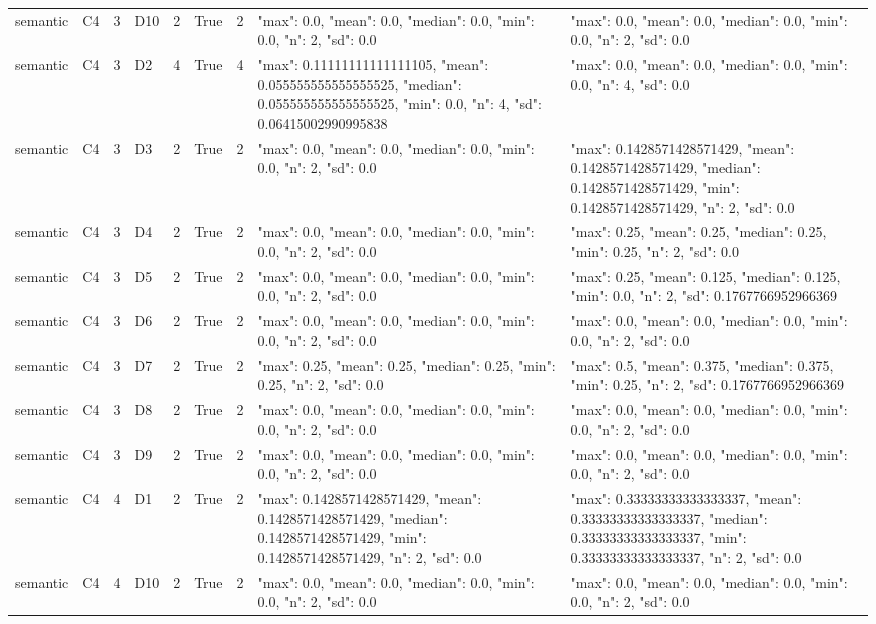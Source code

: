 \begin{tabular}{lllllllll}
semantic & C4 & 3 & D10 & 2 & True & 2 & {"max": 0.0, "mean": 0.0, "median": 0.0, "min": 0.0, "n": 2, "sd": 0.0} & {"max": 0.0, "mean": 0.0, "median": 0.0, "min": 0.0, "n": 2, "sd": 0.0} \\
semantic & C4 & 3 & D2 & 4 & True & 4 & {"max": 0.11111111111111105, "mean": 0.055555555555555525, "median": 0.055555555555555525, "min": 0.0, "n": 4, "sd": 0.06415002990995838} & {"max": 0.0, "mean": 0.0, "median": 0.0, "min": 0.0, "n": 4, "sd": 0.0} \\
semantic & C4 & 3 & D3 & 2 & True & 2 & {"max": 0.0, "mean": 0.0, "median": 0.0, "min": 0.0, "n": 2, "sd": 0.0} & {"max": 0.1428571428571429, "mean": 0.1428571428571429, "median": 0.1428571428571429, "min": 0.1428571428571429, "n": 2, "sd": 0.0} \\
semantic & C4 & 3 & D4 & 2 & True & 2 & {"max": 0.0, "mean": 0.0, "median": 0.0, "min": 0.0, "n": 2, "sd": 0.0} & {"max": 0.25, "mean": 0.25, "median": 0.25, "min": 0.25, "n": 2, "sd": 0.0} \\
semantic & C4 & 3 & D5 & 2 & True & 2 & {"max": 0.0, "mean": 0.0, "median": 0.0, "min": 0.0, "n": 2, "sd": 0.0} & {"max": 0.25, "mean": 0.125, "median": 0.125, "min": 0.0, "n": 2, "sd": 0.1767766952966369} \\
semantic & C4 & 3 & D6 & 2 & True & 2 & {"max": 0.0, "mean": 0.0, "median": 0.0, "min": 0.0, "n": 2, "sd": 0.0} & {"max": 0.0, "mean": 0.0, "median": 0.0, "min": 0.0, "n": 2, "sd": 0.0} \\
semantic & C4 & 3 & D7 & 2 & True & 2 & {"max": 0.25, "mean": 0.25, "median": 0.25, "min": 0.25, "n": 2, "sd": 0.0} & {"max": 0.5, "mean": 0.375, "median": 0.375, "min": 0.25, "n": 2, "sd": 0.1767766952966369} \\
semantic & C4 & 3 & D8 & 2 & True & 2 & {"max": 0.0, "mean": 0.0, "median": 0.0, "min": 0.0, "n": 2, "sd": 0.0} & {"max": 0.0, "mean": 0.0, "median": 0.0, "min": 0.0, "n": 2, "sd": 0.0} \\
semantic & C4 & 3 & D9 & 2 & True & 2 & {"max": 0.0, "mean": 0.0, "median": 0.0, "min": 0.0, "n": 2, "sd": 0.0} & {"max": 0.0, "mean": 0.0, "median": 0.0, "min": 0.0, "n": 2, "sd": 0.0} \\
semantic & C4 & 4 & D1 & 2 & True & 2 & {"max": 0.1428571428571429, "mean": 0.1428571428571429, "median": 0.1428571428571429, "min": 0.1428571428571429, "n": 2, "sd": 0.0} & {"max": 0.33333333333333337, "mean": 0.33333333333333337, "median": 0.33333333333333337, "min": 0.33333333333333337, "n": 2, "sd": 0.0} \\
semantic & C4 & 4 & D10 & 2 & True & 2 & {"max": 0.0, "mean": 0.0, "median": 0.0, "min": 0.0, "n": 2, "sd": 0.0} & {"max": 0.0, "mean": 0.0, "median": 0.0, "min": 0.0, "n": 2, "sd": 0.0} \\

\end{tabular}
